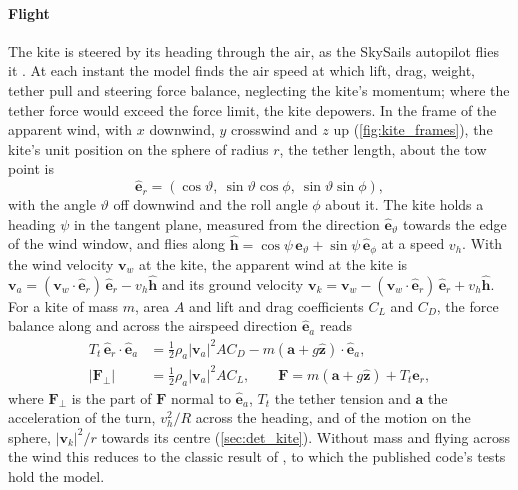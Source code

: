 \paragraph{Flight} The kite is steered by its heading through the air, as the SkySails autopilot flies it \citep[Sec.~VIII]{erhard2013}. At each instant the model finds the air speed at which lift, drag, weight, tether pull and steering force balance, neglecting the kite's momentum; where the tether force would exceed the force limit, the kite depowers. In the frame of the apparent wind, with $x$ downwind, $y$ crosswind and $z$ up (\cref{fig:kite_frames}), the kite's unit position on the sphere of radius $r$, the tether length, about the tow point is
\begin{equation}
\hat{\mathbf e}_r = (\cos\vartheta,\ \sin\vartheta\cos\phi,\ \sin\vartheta\sin\phi),
\end{equation}
with the angle $\vartheta$ off downwind and the roll angle $\phi$ about it. The kite holds a heading $\psi$ in the tangent plane, measured from the direction $\hat{\mathbf e}_\vartheta$ towards the edge of the wind window, and flies along $\hat{\mathbf h} = \cos\psi\,\hat{\mathbf e}_\vartheta + \sin\psi\,\hat{\mathbf e}_\phi$ at a speed $v_h$. With the wind velocity $\mathbf v_w$ at the kite, the apparent wind at the kite is $\mathbf v_a = (\mathbf v_w\cdot\hat{\mathbf e}_r)\,\hat{\mathbf e}_r - v_h\hat{\mathbf h}$ and its ground velocity $\mathbf v_k = \mathbf v_w - (\mathbf v_w\cdot\hat{\mathbf e}_r)\,\hat{\mathbf e}_r + v_h\hat{\mathbf h}$. For a kite of mass $m$, area $A$ and lift and drag coefficients $C_L$ and $C_D$, the force balance along and across the airspeed direction $\hat{\mathbf e}_a$ reads
\begin{align}
T_t\,\hat{\mathbf e}_r\cdot\hat{\mathbf e}_a &= \tfrac12\rho_a|\mathbf v_a|^2 A C_D - m(\mathbf a + g\hat{\mathbf z})\cdot\hat{\mathbf e}_a, \label{eq:kite_drag}\\
\left|\mathbf F_\perp\right| &= \tfrac12\rho_a|\mathbf v_a|^2 A C_L, \qquad \mathbf F = m(\mathbf a + g\hat{\mathbf z}) + T_t\hat{\mathbf e}_r, \label{eq:kite_lift}
\end{align}
where $\mathbf F_\perp$ is the part of $\mathbf F$ normal to $\hat{\mathbf e}_a$, $T_t$ the tether tension and $\mathbf a$ the acceleration of the turn, $v_h^2/R$ across the heading, and of the motion on the sphere, $|\mathbf v_k|^2/r$ towards its centre (\cref{sec:det_kite}). Without mass and flying across the wind this reduces to the classic result of \citet{loyd1980}, to which the published code's tests hold the model.

